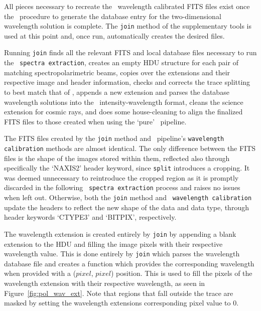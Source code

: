 All pieces necessary to recreate the \polsalt\ wavelength calibrated \gls{FITS} files exist once the \iraf\ procedure to generate the database entry for the two-dimensional wavelength solution is complete. The \texttt{join} method of the supplementary tools is used at this point and, once run, automatically creates the desired files.

Running \texttt{join} finds all the relevant \gls{FITS} and local database files necessary to run the \polsalt\ \texttt{spectra extraction}, creates an empty \gls{HDU} structure for each pair of matching spectropolarimetric beams, copies over the extensions and their respective image and header information, checks and corrects the trace splitting to best match that of \polsalt, appends a new extension and parses the database wavelength solutions into the \polsalt\ intensity-wavelength format, cleans the science extension for cosmic rays, and does some house-cleaning to align the finalized \gls{FITS} files to those created when using the `pure' \polsalt\ pipeline.

The \gls{FITS} files created by the \texttt{join} method and \polsalt\ pipeline's \texttt{wavelength calibration} methods are almost identical. The only difference between the \gls{FITS} files is the shape of the images stored within them, reflected also through specifically the `NAXIS2' header keyword, since \texttt{split} introduces a cropping. It was deemed unnecessary to reintroduce the cropped region as it is promptly discarded in the following \polsalt\ \texttt{spectra extraction} process and raises no issues when left out. Otherwise, both the \texttt{join} method and \polsalt\ \texttt{wavelength calibration} update the headers to reflect the new shape of the data and data type, through header keywords `CTYPE3' and `BITPIX', respectively.

The wavelength extension is created entirely by \texttt{join} by appending a blank extension to the \gls{HDU} and filling the image pixels with their respective wavelength value. This is done entirely by \texttt{join} which parses the wavelength database file and creates a function which provides the corresponding wavelength when provided with a ($pixel$, $pixel$) position. This is used to fill the pixels of the wavelength extension with their respective wavelength, as seen in Figure~\ref{fig:pol_wav_ext}. Note that regions that fall outside the trace are masked by setting the wavelength extensions corresponding pixel value to $0$.

